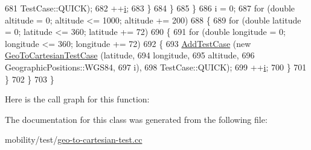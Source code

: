 \begin{DoxyCode}
681                            TestCase::QUICK);
682               ++\hyperlink{bernuolliDistribution_8m_a6f6ccfcf58b31cb6412107d9d5281426}{i};
683             \}
684         \}
685     \}
686   i = 0;
687   \textcolor{keywordflow}{for} (\textcolor{keywordtype}{double} altitude = 0; altitude <= 1000; altitude += 200)
688     \{
689       \textcolor{keywordflow}{for} (\textcolor{keywordtype}{double} latitude = 0; latitude <= 360; latitude += 72)
690         \{
691           \textcolor{keywordflow}{for} (\textcolor{keywordtype}{double} longitude = 0; longitude <= 360; longitude += 72)
692             \{
693               \hyperlink{classns3_1_1TestCase_a3718088e3eefd5d6454569d2e0ddd835}{AddTestCase} (\textcolor{keyword}{new} \hyperlink{classGeoToCartesianTestCase}{GeoToCartesianTestCase} (latitude, 
694                                                        longitude, 
695                                                        altitude, 
696                                                        GeographicPositions::WGS84,
697                                                        i), 
698                            TestCase::QUICK);
699               ++\hyperlink{bernuolliDistribution_8m_a6f6ccfcf58b31cb6412107d9d5281426}{i};
700             \}
701         \}
702     \}
703 \}
\end{DoxyCode}


Here is the call graph for this function\+:




The documentation for this class was generated from the following file\+:\begin{DoxyCompactItemize}
\item 
mobility/test/\hyperlink{geo-to-cartesian-test_8cc}{geo-\/to-\/cartesian-\/test.\+cc}\end{DoxyCompactItemize}
